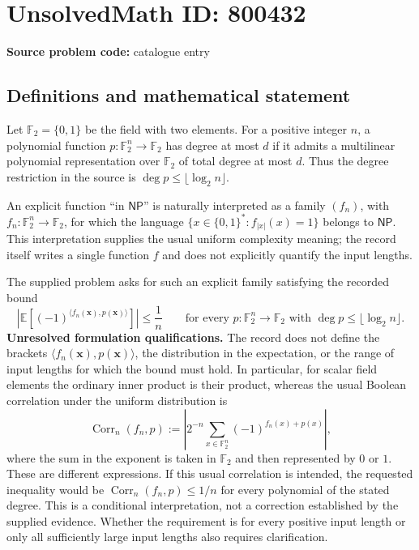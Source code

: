 \documentclass[11pt]{article}
\newcommand{\F}{\mathbb{F}}
\begin{document}
\section*{UnsolvedMath ID: 800432}
\textbf{Source problem code:} catalogue entry
\subsection{Definitions and mathematical statement}
Let \(\F_2=\{0,1\}\) be the field with two elements. For a positive integer \(n\), a polynomial function \(p:\F_2^n\to\F_2\) has degree at most \(d\) if it admits a multilinear polynomial representation over \(\F_2\) of total degree at most \(d\). Thus the degree restriction in the source is \(\deg p\leq\lfloor\log_2 n\rfloor\).

An explicit function ``in \(\mathsf{NP}\)'' is naturally interpreted as a family \((f_n)\), with \(f_n:\F_2^n\to\F_2\), for which the language \(\{x\in\{0,1\}^*:f_{|x|}(x)=1\}\) belongs to \(\mathsf{NP}\). This interpretation supplies the usual uniform complexity meaning; the record itself writes a single function \(f\) and does not explicitly quantify the input lengths.

The supplied problem asks for such an explicit family satisfying the recorded bound
\[
 \left|\mathbb E\left[(-1)^{\langle f_n(\mathbf x),p(\mathbf x)\rangle}\right]\right|
 \leq \frac1n
 \qquad\text{for every }p:\F_2^n\to\F_2
 \text{ with }\deg p\leq\lfloor\log_2 n\rfloor.
\]
\textbf{Unresolved formulation qualifications.} The record does not define the brackets \(\langle f_n(\mathbf x),p(\mathbf x)\rangle\), the distribution in the expectation, or the range of input lengths for which the bound must hold. In particular, for scalar field elements the ordinary inner product is their product, whereas the usual Boolean correlation under the uniform distribution is
\[
 \operatorname{Corr}_n(f_n,p)
 :=\left|2^{-n}\sum_{x\in\F_2^n}(-1)^{f_n(x)+p(x)}\right|,
\]
where the sum in the exponent is taken in \(\F_2\) and then represented by \(0\) or \(1\). These are different expressions. If this usual correlation is intended, the requested inequality would be \(\operatorname{Corr}_n(f_n,p)\leq 1/n\) for every polynomial of the stated degree. This is a conditional interpretation, not a correction established by the supplied evidence. Whether the requirement is for every positive input length or only all sufficiently large input lengths also requires clarification.
\end{document}
